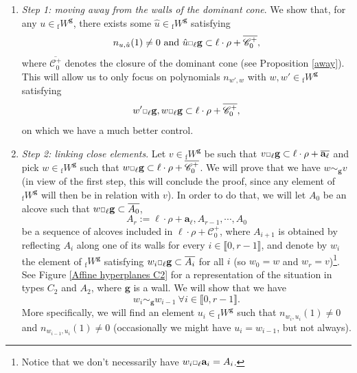 \documentclass[11pt]{amsart}
\theoremstyle{plain}
\theoremstyle{remark}
\newcommand{\car}{\mbox{\relsize{-5}$\Box$}}
\numberwithin{equation}{section}
\begin{document}
	 \begin{enumerate}
	     \item \textit{Step 1: moving away from the walls of the dominant cone}. We show that, for any $u\in {_\mathrm{f}W}^{\mathbf{g}}$, there exists some $\hat{u}\in {_\mathrm{f}W}^{\mathbf{g}}$ satisfying $$n_{u,\hat{u}}(1)\neq 0~\text{and}~\hat{u}\car_\ell\mathbf{g}\subset\ell\cdot\rho+\overline{\mathscr{C}^+_0},$$ where $\overline{\mathscr{C}^+_0}$ denotes the closure of the dominant cone (see Proposition \ref{away}). This will allow us to only focus on polynomials $n_{w',w}$ with $w,w'\in {_\mathrm{f}W}^{\mathbf{g}}$ satisfying $$w'\car_\ell\mathbf{g},w\car_\ell\mathbf{g}\subset\ell\cdot\rho+\overline{\mathscr{C}^+_0},$$
	     on which we have a much better control.
	     \item\textit{Step 2: linking close elements}. Let $v\in {_\mathrm{f}W}^{\mathbf{g}}$ be such that $ v\car_\ell\mathbf{g}\subset \ell\cdot\rho+ \overline{\mathbf{a}_\ell}$ and pick $w\in {_\mathrm{f}W}^{\mathbf{g}}$ such that $w\car_\ell\mathbf{g}\subset\ell\cdot\rho+\overline{\mathscr{C}^+_0}$. We will prove that we have $w\sim_\mathbf{g} v$ (in view of the first step, this will conclude the proof, since any element of ${_\mathrm{f}W}^{\mathbf{g}}$ will then be in relation with $v$). In order to do that, we will let $A_0$ be an alcove such that $w\car_\ell\mathbf{g}\subset\overline{A_0}$,
	     $$A_r:=\ell\cdot\rho+\mathbf{a}_\ell,A_{r-1},\cdots,A_0 $$
	     be a sequence of alcoves included in $\ell\cdot\rho+\mathscr{C}^+_0$, where $A_{i+1}$ is obtained by reflecting $A_{i}$ along one of its walls for every $i\in\llbracket0,r-1\rrbracket$, and denote by $w_i$ the element of ${_\mathrm{f}W}^{\mathbf{g}}$ satisfying $w_i\car_\ell\mathbf{g}\subset\overline{A_i}$ for all $i$ (so $w_0=w$ and $w_r=v$)\footnote{Notice that we don't necessarily have $w_i\car_\ell \mathbf{a}_i=A_i$.}. See Figure \ref{Affine hyperplanes C2} for a representation of the situation in types $C_2$ and $A_2$, where $\mathbf{g}$ is a wall. We will show that we have
	     $$w_i\sim_\mathbf{g}w_{i-1}~\forall i\in\llbracket0,r-1\rrbracket. $$
	     More specifically, we will find an element $u_i\in{_\mathrm{f}W}^{\mathbf{g}}$ such that $n_{w_i,u_i}(1)\neq 0$ and $n_{w_{i-1},u_i}(1)\neq 0$ (occasionally we might have $u_i=w_{i-1}$, but not always).
	 \end{enumerate}
\end{document}
